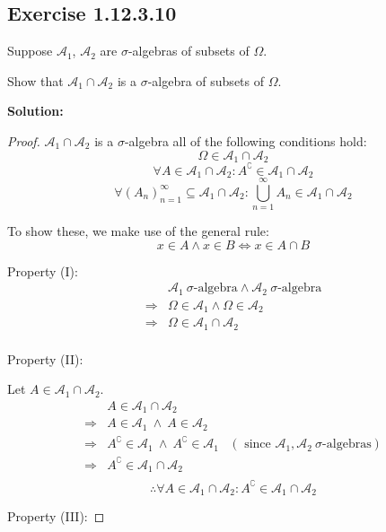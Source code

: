\documentclass{article}
\begin{document}
\subsection{Exercise 1.12.3.10}

Suppose \(\mathcal{A}_1\), \(\mathcal{A}_2\) are \(\sigma\)-algebras
of subsets of \(\Omega\).

Show that \(\mathcal{A}_1 \cap \mathcal{A}_2\) is a \(\sigma\)-algebra
of subsets of \(\Omega\).

\textbf{Solution:}
\begin{proof}
\(\mathcal{A}_1\cap\mathcal{A}_2\) is a \(\sigma\)-algebra all of the following conditions hold:
\[\Omega \in \mathcal{A}_1\cap\mathcal{A}_2 \tag{I}\]
\[\forall A\in \mathcal{A}_1\cap \mathcal{A}_2: A^\complement \in \mathcal{A}_1\cap \mathcal{A}_2 \tag{II}\]
\[\forall (A_n)_{n=1}^\infty\subseteq \mathcal{A}_1\cap \mathcal{A}_2: \bigcup_{n=1}^\infty A_n \in \mathcal{A}_1\cap \mathcal{A}_2 \tag{III}\]

To show these, we make use of the general rule:
\[x\in A \wedge x\in B \Leftrightarrow x\in A\cap B\]

Property (I):
\begin{align*}
	& \mathcal{A}_1\ \sigma\text{-algebra} \wedge \mathcal{A}_2\ \sigma\text{-algebra} \\
	\Rightarrow& \Omega \in \mathcal{A}_1 \wedge \Omega \in \mathcal{A}_2 \\
	\Rightarrow& \Omega \in \mathcal{A}_1 \cap \mathcal{A}_2 \\
\end{align*}

Property (II):

Let \(A \in \mathcal{A}_1 \cap \mathcal{A}_2\).
\begin{align*}
    & A \in \mathcal{A}_1\cap \mathcal{A}_2 \\
    \Rightarrow & A \in \mathcal{A}_1\ \wedge\ A \in \mathcal{A}_2 \\
    \Rightarrow & A^\complement \in \mathcal{A}_1\ \wedge\ A^\complement \in \mathcal{A}_1 & (\text{ since }\mathcal{A}_1,\mathcal{A}_2\ \sigma\text{-algebras}) \\
    \Rightarrow & A^\complement \in \mathcal{A}_1\cap\mathcal{A}_2 \\
\end{align*}
\[\therefore \forall A\in \mathcal{A}_1\cap \mathcal{A}_2: A^\complement\in\mathcal{A}_1\cap \mathcal{A}_2\]

Property (III):


\end{proof}
\end{document}
